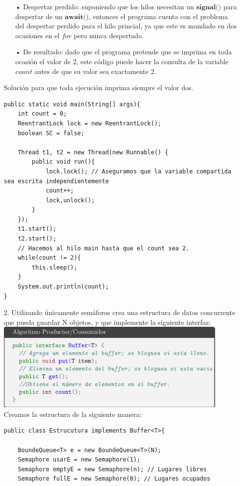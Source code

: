 \documentclass[12pt, letterpaper]{article}
\begin{document}
\begin{itemize}
\begin{itemize}
\item[• ] Despertar perdido: suponiendo que los hilos necesitan un $\textbf{signal()}$ para despertar de un $\textbf{await()}$, entonces el programa cuenta con el problema del despertar perdido para el hilo princial, ya que este es mandado en dos ocasiones en el $for$ pero nunca despertado.

\item[• ] De resultado: dado que el programa pretende que se imprima en toda ocasión el valor de 2, este código puede hacer la consulta de la variable $count$ antes de que su valor sea exactamente 2.
\end{itemize}


Solución para que toda ejecución imprima siempre el valor dos.

\begin{lstlisting}
public static void main(String[] args){
	int count = 0;
	ReentrantLock lock = new ReentrantLock();
	boolean SC = false;
	
	Thread t1, t2 = new Thread(new Runnable() {
		public void run(){
			lock.lock(); // Aseguramos que la variable compartida sea escrita independientemente
			count++;
			lock,unlock();
		}
	});
	t1.start();
	t2.start();
	// Hacemos al hilo main hasta que el count sea 2.
	while(count != 2){
		this.sleep();
	}
	System.out.println(count);
}
\end{lstlisting}

\item[2. ] Utilizando únicamente semáforos crea una estructura de datos concurrente que
pueda guardar N objetos, y que implemente la siguiente interfaz:\\

\includegraphics[width=0.9\textwidth]{dos.png}\\
Creamos la estructura de la siguiente manera:
\begin{lstlisting}
public class Estrucutura implements Buffer<T>{

    BoundeQueue<T> e = new BoundeQueue<T>(N);
    Semaphore usarE = new Semaphore(1);
    Semaphore emptyE = new Semaphore(n); // Lugares libres
    Semaphore fullE = new Semaphore(0); // Lugares ocupados


\end{lstlisting}
\end{itemize}
\end{document}
